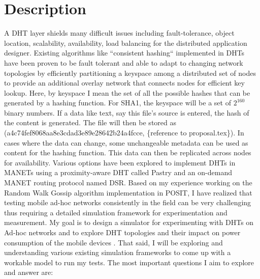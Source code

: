 \documentclass[a4paper,10pt]{article}
\newcommand{\cmt}[2]{#2}
\begin{document}

\section*{Description}
A DHT layer shields many difficult issues including fault-tolerance, \cmt{locating object}{object location}, scalability, availability, load balancing for \cmt{}{the} distributed application designer\cite{Saumitra04howto}. Existing algorithms like ``consistent hashing`` implemented in DHTs have been proven to be fault tolerant and able to adapt to changing network topologies by efficiently partitioning a keyspace among \cmt{}{a} distributed set of nodes \cmt{and}{to} provide an additional overlay network \cmt{which connects nodes such that the node responsible for any key can be efficiently located}{that connects nodes for efficient key lookup}\cite{consistentHashing}. Here, by keyspace I mean the set of all the possible hashes that can be generated by a hashing function. For SHA1, the keyspace will be a set of $2^160$ binary numbers. If a data like text, say this file's source is entered, the hash of the content is generated. The file will then be stored as (a4c74fef8068aa8e3cdad3e89e28642b24a4fcce, \{reference to proposal.tex\}). In cases where the data can change, some unchangeable metadata can be used as content for the hashing function. This data can then be replicated across nodes for availability. Various options have been explored to implement DHTs in MANETs using a proximity-aware DHT \cmt{}{called} Pastry\cite{Rowstron01pastry:scalable} and \cmt{}{an} on-demand MANET routing protocol \cmt{}{named} DSR\cite{Johnson02dynamicsource}. Based on my experience working on the Random Walk Gossip algorithm implementation \cmt{on}{in} POSIT\cite{positRWG}, I have realized that testing mobile ad-hoc networks consistently in the field can be very challenging \cmt{without}{thus requiring} a detailed \cmt{test}{} simulation \cmt{}{framework} \cmt{to base it on}{for experimentation and measurement}. My goal is to design a simulator for experimenting with DHTs on Ad-hoc networks\cmt{,}{ and to} explor\cmt{ing}{e} \cmt{network}{DHT} topologies and \cmt{}{their impact on} power consumption \cmt{in the}{of the mobile} devices \cmt{communicating}{}. That said, I will be exploring and understanding various existing simulation frameworks to come up with a workable model to run my tests. The most important questions I aim to explore and answer are:
\end{document}

